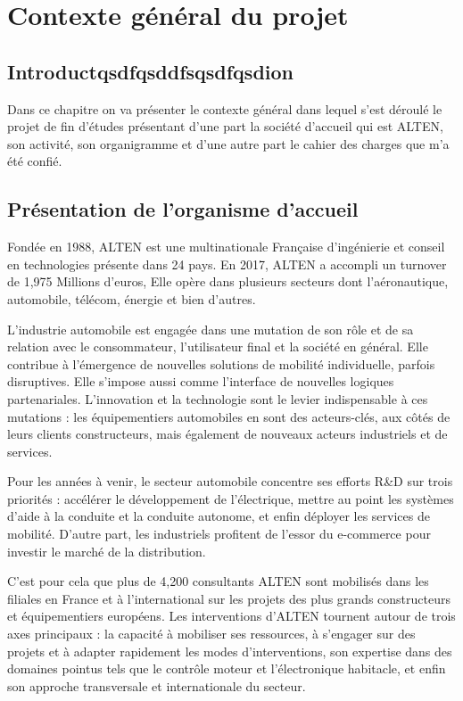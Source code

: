 \chapter{Contexte général du projet}
\section*{Introductqsdfqsddfsqsdfqsdion}
Dans ce chapitre on va présenter le contexte général dans lequel s’est déroulé le projet de fin d’études présentant d’une part la société d’accueil qui est ALTEN, son activité, son organigramme et d’une autre part le cahier des charges que m’a été confié.

\section{Présentation de l'organisme d'accueil}
Fondée en 1988, ALTEN est une multinationale Française d’ingénierie et conseil en technologies présente dans 24 pays. En 2017, ALTEN a accompli un turnover de 1,975 Millions d’euros, Elle opère dans plusieurs secteurs dont l’aéronautique, automobile, télécom, énergie et bien d’autres. 

L’industrie automobile est engagée dans une mutation de son rôle et de sa relation avec le consommateur, l’utilisateur final et la société en général. Elle contribue à l’émergence de nouvelles solutions de mobilité individuelle, parfois disruptives. Elle s’impose aussi comme l’interface de nouvelles logiques partenariales. L’innovation et la technologie sont le levier indispensable à ces mutations : les équipementiers automobiles en sont des acteurs-clés, aux côtés de leurs clients constructeurs, mais également de nouveaux acteurs industriels et de services.

Pour les années à venir, le secteur automobile concentre ses efforts R\&D sur trois priorités : accélérer le développement de l’électrique, mettre au point les systèmes d’aide à la conduite et la conduite autonome, et enfin déployer les services de mobilité. D’autre part, les industriels profitent de l’essor du e-commerce pour investir le marché de la distribution.

C’est pour cela que plus de 4,200 consultants ALTEN sont mobilisés dans les filiales en France et à l’international sur les projets des plus grands constructeurs et équipementiers européens. Les interventions d’ALTEN tournent autour de trois axes principaux : la capacité à mobiliser ses ressources, à s’engager sur des projets et à adapter rapidement les modes d’interventions, son expertise dans des domaines pointus tels que le contrôle moteur et l’électronique habitacle, et enfin son approche transversale et internationale du secteur.

